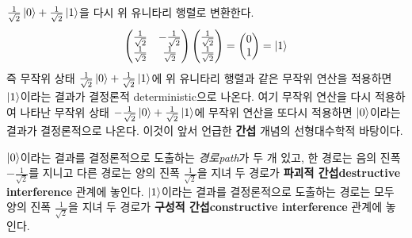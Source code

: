 \documentclass[a4paper,chapter,atbegshi]{oblivoir}
\begin{document}
$\frac{1}{\sqrt2}\ket{0}+\frac{1}{\sqrt2}\ket{1}$을 다시 위 유니타리 행렬로
변환한다.
\[
  \begin{pmatrix}
    \frac{1}{\sqrt{2}} &-\frac{1}{\sqrt{2}} \\
    \frac{1}{\sqrt{2}} &\frac{1}{\sqrt2}
  \end{pmatrix}
  \begin{pmatrix}
    \frac{1}{\sqrt2}\\\frac{1}{\sqrt2}
  \end{pmatrix}
  =\begin{pmatrix}0\\1\end{pmatrix}=\ket{1}
\]
즉 무작위 상태 $\frac{1}{\sqrt2}\ket{0}+\frac{1}{\sqrt2}\ket{1}$에 위 유니타리
행렬과 같은 무작위 연산을 적용하면 $\ket{1}$이라는 결과가 결정론적{\tiny
deterministic}으로 나온다. 여기 무작위 연산을 다시 적용하여 나타난 무작위 상태
 $-\frac{1}{\sqrt2}\ket{0}+\frac{1}{\sqrt2}\ket{1}$에 무작위 연산을 또다시
 적용하면 $\ket{0}$이라는 결과가 결정론적으로 나온다. 이것이 앞서 언급한
 \textbf{간섭} 개념의 선형대수학적 바탕이다. 

 $\ket{0}$이라는 결과를 결정론적으로 도출하는 \emph{경로\tiny path}가 두 개 있고,
 한 경로는 음의 진폭 $-\frac{1}{\sqrt2}$를 지니고 다른 경로는 양의 진폭 
 $\frac{1}{\sqrt2}$을 지녀 두 경로가 \textbf{파괴적 간섭\tiny destructive
 interference} 관계에 놓인다. $\ket{1}$이라는 결과를 결정론적으로 도출하는
 경로는 모두 양의 진폭 $\frac{1}{\sqrt2}$을 지녀 두 경로가 \textbf{구성적 
 간섭\tiny constructive interference} 관계에 놓인다.
\end{document}

